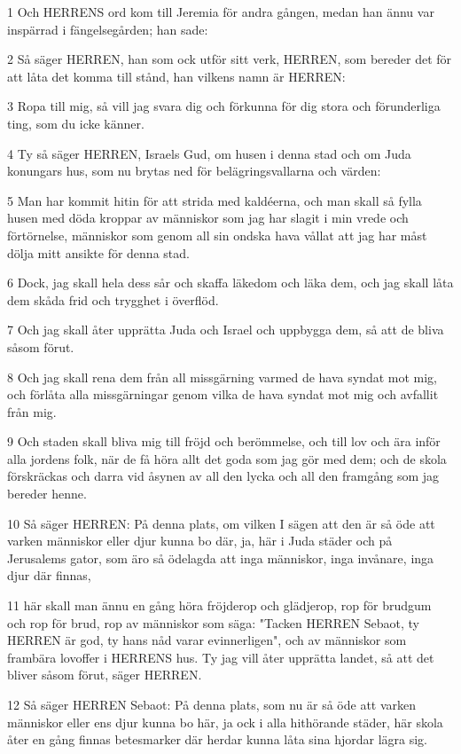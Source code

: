 \par 1 Och HERRENS ord kom till Jeremia för andra gången, medan han ännu var inspärrad i fängelsegården; han sade:
\par 2 Så säger HERREN, han som ock utför sitt verk, HERREN, som bereder det för att låta det komma till stånd, han vilkens namn är HERREN:
\par 3 Ropa till mig, så vill jag svara dig och förkunna för dig stora och förunderliga ting, som du icke känner.
\par 4 Ty så säger HERREN, Israels Gud, om husen i denna stad och om Juda konungars hus, som nu brytas ned för belägringsvallarna och värden:
\par 5 Man har kommit hitin för att strida med kaldéerna, och man skall så fylla husen med döda kroppar av människor som jag har slagit i min vrede och förtörnelse, människor som genom all sin ondska hava vållat att jag har måst dölja mitt ansikte för denna stad.
\par 6 Dock, jag skall hela dess sår och skaffa läkedom och läka dem, och jag skall låta dem skåda frid och trygghet i överflöd.
\par 7 Och jag skall åter upprätta Juda och Israel och uppbygga dem, så att de bliva såsom förut.
\par 8 Och jag skall rena dem från all missgärning varmed de hava syndat mot mig, och förlåta alla missgärningar genom vilka de hava syndat mot mig och avfallit från mig.
\par 9 Och staden skall bliva mig till fröjd och berömmelse, och till lov och ära inför alla jordens folk, när de få höra allt det goda som jag gör med dem; och de skola förskräckas och darra vid åsynen av all den lycka och all den framgång som jag bereder henne.
\par 10 Så säger HERREN: På denna plats, om vilken I sägen att den är så öde att varken människor eller djur kunna bo där, ja, här i Juda städer och på Jerusalems gator, som äro så ödelagda att inga människor, inga invånare, inga djur där finnas,
\par 11 här skall man ännu en gång höra fröjderop och glädjerop, rop för brudgum och rop för brud, rop av människor som säga: "Tacken HERREN Sebaot, ty HERREN är god, ty hans nåd varar evinnerligen", och av människor som frambära lovoffer i HERRENS hus. Ty jag vill åter upprätta landet, så att det bliver såsom förut, säger HERREN.
\par 12 Så säger HERREN Sebaot: På denna plats, som nu är så öde att varken människor eller ens djur kunna bo här, ja ock i alla hithörande städer, här skola åter en gång finnas betesmarker där herdar kunna låta sina hjordar lägra sig.
